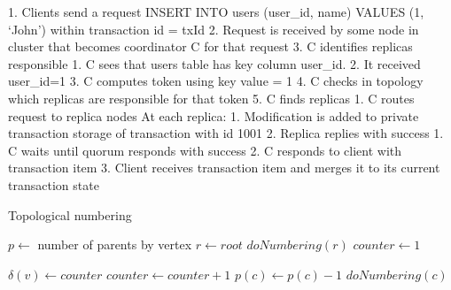 1. Clients send a request INSERT INTO users (user_id, name) VALUES (1, ‘John’) within transaction id = txId
2. Request is received by some node in cluster that becomes coordinator C for that request
3. C identifies replicas responsible
   1. C sees that users table has key column user_id. 
   2. It received user_id=1
   3. C computes token using key value = 1 
   4. C checks in topology which replicas are responsible for that token
   5. C finds replicas
1. C routes request to replica nodes
At each replica:
   1. Modification is added to private transaction storage of transaction with id 1001
   2. Replica replies with success
1. C waits until quorum responds with success
2. C responds to client with transaction item
3. Client receives transaction item and merges it to its current transaction state

\begin{algorithm}
  \caption{Topological numbering}
  \label{alg:topologicalNumbering}
  \begin{algorithmic}
    \State $p \gets$ number of parents by vertex
    \State $r \gets root$
    \State $doNumbering(r)$
    \State $counter \gets 1$
    
      \State $\delta(v) \gets counter$
      \State $counter \gets counter + 1$
        \State $p(c) \gets p(c) - 1$
          \State $doNumbering(c)$
        \EndIf
      \EndFor
    \EndFunction
  \end{algorithmic}
\end{algorithm} 

  
        
  
